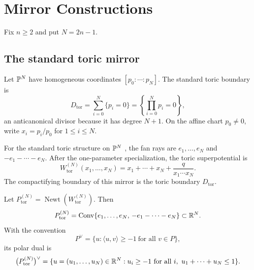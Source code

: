 \section{Mirror Constructions}

Fix \(n\ge2\) and put \(N=2n-1\).

\subsection{The standard toric mirror}

Let \(\mathbb{P}^N\) have homogeneous coordinates \([p_0:\cdots:p_N]\). The standard
toric boundary is
\[
D_{\mathrm{tor}}
=
\sum_{i=0}^N\{p_i=0\}
=
\left\{\prod_{i=0}^N p_i=0\right\},
\]
an anticanonical divisor because it has degree \(N+1\). On the affine chart
\(p_0\ne 0\), write \(x_i=p_i/p_0\) for \(1\leq i\leq N\).

\begin{exam}\label{ex:tor-PN}
For the standard toric structure on \(\mathbb{P}^N\) \cite{Bat93,Givental,Givental98,HV}, the fan rays are
\(e_1,\ldots,e_N\) and \(-e_1-\cdots-e_N\). After the one-parameter
specialization, the toric superpotential is
\[
W_{\mathrm{tor}}^{(N)}(x_1,\ldots,x_N)
=
x_1+\cdots+x_N+\frac{q}{x_1\cdots x_N}.
\]
The compactifying boundary of this mirror is the toric boundary
\(D_{\mathrm{tor}}\).
\end{exam}

Let \(P_{\mathrm{tor}}^{(N)}=\operatorname{Newt}(W_{\mathrm{tor}}^{(N)})\). Then
\[
P_{\mathrm{tor}}^{(N)}
=
\operatorname{Conv}\{e_1,\ldots,e_N,\,-e_1-\cdots-e_N\}
\subset \mathbb{R}^N.
\]
With the convention
\[
P^\vee=\{u:\langle u,v\rangle\ge -1\ \text{for all }v\in P\},
\]
its polar dual is
\[
\bigl(P_{\mathrm{tor}}^{(N)}\bigr)^\vee
=
\{u=(u_1,\ldots,u_N)\in\RR^N:
u_i\ge -1\ \text{for all }i,\ 
u_1+\cdots+u_N\le1\}.
\]
